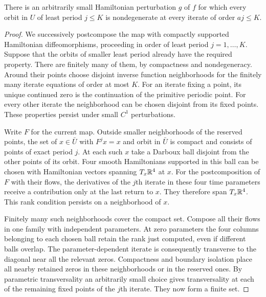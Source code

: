 \begin{lemma}\label{lem:finite-perturbation}
There is an arbitrarily small Hamiltonian perturbation $g$ of $f$
for which every orbit in $U$ of least period $j\le K$ is
nondegenerate at every iterate of order $aj\le K$.
\end{lemma}
\begin{proof}
We successively postcompose the map with compactly supported
Hamiltonian diffeomorphisms, proceeding in order of least period
$j=1,\ldots,K$. Suppose that the orbits of smaller least period
already have the required property. There are finitely many of
them, by compactness and nondegeneracy. Around their points choose
disjoint inverse function neighborhoods for the finitely many
iterate equations of order at most $K$. For an iterate fixing a
point, its unique continued zero is the continuation of the
primitive periodic point. For every other iterate the
neighborhood can be chosen disjoint from its fixed points.
These properties persist under small $C^1$ perturbations.

Write $F$ for the current map. Outside smaller neighborhoods of the
reserved points, the set of $x\in\bar U$ with $F^j x=x$ and orbit
in $\bar U$ is compact and consists of points of exact period $j$.
At each such $x$ take a Darboux ball disjoint from the other points
of its orbit. Four smooth Hamiltonians supported in this ball can
be chosen with Hamiltonian vectors spanning $T_x\mathbb R^4$ at $x$.
For the postcomposition of $F$ with their flows, the derivatives
of the $j$th iterate in these four time parameters receive a
contribution only at the last return to $x$. They therefore span
$T_x\mathbb R^4$. This rank condition persists on a neighborhood of $x$.

Finitely many such neighborhoods cover the compact set. Compose all
their flows in one family with independent parameters. At zero
parameters the four columns belonging to each chosen ball retain
the rank just computed, even if different balls overlap. The
parameter-dependent iterate is consequently transverse to the
diagonal near all the relevant zeros. Compactness and boundary
isolation place all nearby retained zeros in these neighborhoods or
in the reserved ones. By parametric transversality an arbitrarily
small choice gives transversality at each of the remaining fixed
points of the $j$th iterate. They now form a finite set.


\end{proof}
